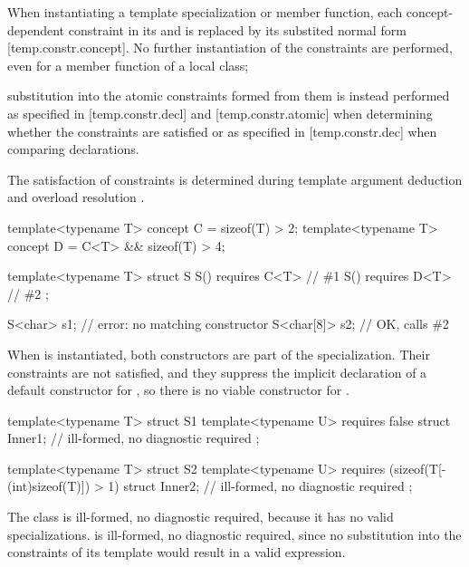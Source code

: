 \documentclass{wg21}
\begin{document}
\pnum
{}
\begin{addedblock}
When instantiating a template specialization or member function, each concept-dependent constraint
in its  and 
is replaced by its substited normal form [temp.constr.concept].
No further instantiation of the constraints are performed,  even for a member function of a local class;
\end{addedblock}
substitution into the atomic constraints formed from them is instead performed
as specified in [temp.constr.decl] and [temp.constr.atomic]
when determining whether the constraints are satisfied
or as specified in [temp.constr.dec] when comparing declarations.
\begin{note}
    The satisfaction of constraints is determined during
    template argument deduction  and
    overload resolution .
\end{note}
\begin{example}
\begin{codeblock}
    template<typename T> concept C = sizeof(T) > 2;
    template<typename T> concept D = C<T> && sizeof(T) > 4;

    template<typename T> struct S {
        S() requires C<T> { }         // \#1
        S() requires D<T> { }         // \#2
    };

    S<char> s1;                     // error: no matching constructor
    S<char[8]> s2;                  // OK, calls \#2
\end{codeblock}
When  is instantiated, both constructors are part of the
specialization. Their constraints are not satisfied, and
they suppress the implicit declaration of a default constructor for
 , so there is no viable constructor
for .
\end{example}
\begin{example}
\begin{codeblock}
    template<typename T> struct S1 {
        template<typename U>
        requires false
        struct Inner1;                // ill-formed, no diagnostic required
    };

    template<typename T> struct S2 {
        template<typename U>
        requires (sizeof(T[-(int)sizeof(T)]) > 1)
        struct Inner2;                // ill-formed, no diagnostic required
    };
\end{codeblock}
The class  is ill-formed, no diagnostic required, because
it has no valid specializations.
 is ill-formed, no diagnostic required, since no substitution into
the constraints of its  template would result in a valid
expression.
\end{example}
\end{document}
